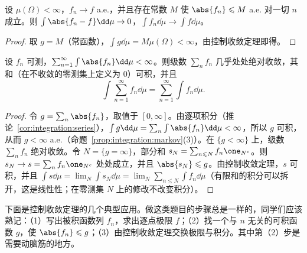 \begin{corollary}[有界收敛定理]\label{cor:integration:bct}
设 $\mu(\Omega)<\infty$，$f_n\to f$ a.e.，并且存在常数 $M$ 使 $\abs{f_n}\leqslant M$ a.e. 对一切 $n$ 成立。则 $\int\abs{f_n-f}\dd\mu\to0$，$\int f_n\dd\mu\to\int f\dd\mu$。
\end{corollary}
\begin{proof}
取 $g=M$（常函数），$\int g\dd\mu=M\mu(\Omega)<\infty$，由控制收敛定理即得。
\end{proof}

\begin{corollary}[可积函数项级数的逐项积分]\label{cor:integration:series-integrable}
设 $f_n$ 可测，$\sum_{n=1}^\infty\int\abs{f_n}\dd\mu<\infty$。则级数 $\sum_nf_n$ 几乎处处绝对收敛，其和（在不收敛的零测集上定义为 $0$）可积，并且
\[
\int\sum_{n=1}^\infty f_n\dd\mu=\sum_{n=1}^\infty\int f_n\dd\mu .
\]
\end{corollary}
\begin{proof}
令 $g=\sum_n\abs{f_n}$，取值于 $[0,\infty]$。由逐项积分（推论~\ref{cor:integration:series}），$\int g\dd\mu=\sum_n\int\abs{f_n}\dd\mu<\infty$，所以 $g$ 可积，从而 $g<\infty$ a.e.（命题~\ref{prop:integration:markov}(3)）。在 $\{g<\infty\}$ 上，级数 $\sum_nf_n$ 绝对收敛。令 $N=\{g=\infty\}$，部分和 $s_N=\sum_{n\leqslant N}f_n\one_{N^c}$。则 $s_N\to s=\sum_nf_n\one_{N^c}$ 处处成立，并且 $\abs{s_N}\leqslant g$。由控制收敛定理，$s$ 可积，并且 $\int s\dd\mu=\lim_N\int s_N\dd\mu=\lim_N\sum_{n\leqslant N}\int f_n\dd\mu$（有限和的积分可以拆开，这是线性性；在零测集 $N$ 上的修改不改变积分）。
\end{proof}

下面是控制收敛定理的几个典型应用。做这类题目的步骤总是一样的，同学们应该熟记：（1）写出被积函数列 $f_n$，求出逐点极限 $f$；（2）找一个与 $n$ 无关的可积函数 $g$，使 $\abs{f_n}\leqslant g$；（3）由控制收敛定理交换极限与积分。其中第（2）步是需要动脑筋的地方。

